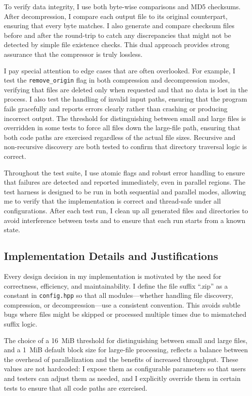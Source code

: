 \documentclass[10pt]{article}
\begin{document}
To verify data integrity, I use both byte-wise comparisons and MD5 checksums. After decompression, I compare each output file to its original counterpart, ensuring that every byte matches. I also generate and compare checksum files before and after the round-trip to catch any discrepancies that might not be detected by simple file existence checks. This dual approach provides strong assurance that the compressor is truly lossless.

I pay special attention to edge cases that are often overlooked. For example, I test the \texttt{remove\_origin} flag in both compression and decompression modes, verifying that files are deleted only when requested and that no data is lost in the process. I also test the handling of invalid input paths, ensuring that the program fails gracefully and reports errors clearly rather than crashing or producing incorrect output. The threshold for distinguishing between small and large files is overridden in some tests to force all files down the large-file path, ensuring that both code paths are exercised regardless of the actual file sizes. Recursive and non-recursive discovery are both tested to confirm that directory traversal logic is correct.

Throughout the test suite, I use atomic flags and robust error handling to ensure that failures are detected and reported immediately, even in parallel regions. The test harness is designed to be run in both sequential and parallel modes, allowing me to verify that the implementation is correct and thread-safe under all configurations. After each test run, I clean up all generated files and directories to avoid interference between tests and to ensure that each run starts from a known state.

\subsection*{Implementation Details and Justifications}
Every design decision in my implementation is motivated by the need for correctness, efficiency, and maintainability. I define the file suffix “.zip” as a constant in \texttt{config.hpp} so that all modules—whether handling file discovery, compression, or decompression—use a consistent convention. This avoids subtle bugs where files might be skipped or processed multiple times due to mismatched suffix logic.

The choice of a 16~MiB threshold for distinguishing between small and large files, and a 1~MiB default block size for large-file processing, reflects a balance between the overhead of parallelization and the benefits of increased throughput. These values are not hardcoded: I expose them as configurable parameters so that users and testers can adjust them as needed, and I explicitly override them in certain tests to ensure that all code paths are exercised.
\end{document}

